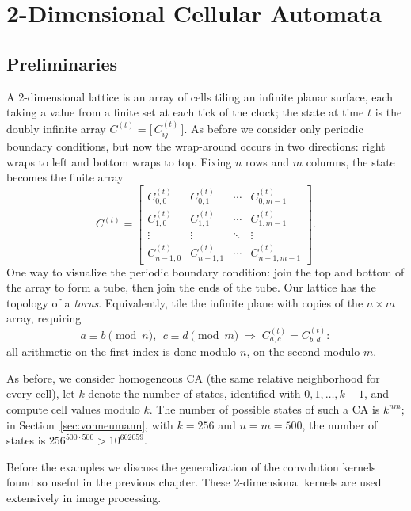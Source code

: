 \chapter{2-Dimensional Cellular Automata}

\section{Preliminaries}

A 2-dimensional lattice is an array of cells tiling an infinite planar
surface, each taking a value from a finite set at each tick of the
clock; the state at time $t$ is the doubly infinite array
$C^{(t)} = \bigl[\,C^{(t)}_{ij}\,\bigr]$.  As before we consider only
periodic boundary conditions, but now the wrap-around occurs in two
directions: right wraps to left and bottom wraps to top.  Fixing $n$
rows and $m$ columns, the state becomes the finite array
\begin{equation}
  C^{(t)} =
  \begin{bmatrix}
    C^{(t)}_{0,0} & C^{(t)}_{0,1} & \cdots & C^{(t)}_{0,m-1}\\
    C^{(t)}_{1,0} & C^{(t)}_{1,1} & \cdots & C^{(t)}_{1,m-1}\\
    \vdots & \vdots & \ddots & \vdots\\
    C^{(t)}_{n-1,0} & C^{(t)}_{n-1,1} & \cdots & C^{(t)}_{n-1,m-1}
  \end{bmatrix}.
\end{equation}
One way to visualize the periodic boundary condition: join the top and
bottom of the array to form a tube, then join the ends of the tube.
Our lattice has the topology of a \emph{torus}.  Equivalently, tile the
infinite plane with copies of the $n\times m$ array, requiring
\begin{equation}
  a \equiv b \pmod n,\ \ c \equiv d \pmod m
  \;\Longrightarrow\; C^{(t)}_{a,c} = C^{(t)}_{b,d}:
\end{equation}
all arithmetic on the first index is done modulo $n$, on the second
modulo $m$.

As before, we consider homogeneous CA (the same relative neighborhood
for every cell), let $k$ denote the number of states, identified with
$0,1,\dots,k-1$, and compute cell values modulo $k$.  The number of
possible states of such a CA is $k^{nm}$; in
Section~\ref{sec:vonneumann}, with $k=256$
and $n=m=500$, the number of states is $256^{500\cdot500} >
10^{602059}$.

Before the examples we discuss the generalization of the convolution
kernels found so useful in the previous chapter.  These 2-dimensional
kernels are used extensively in image processing.

